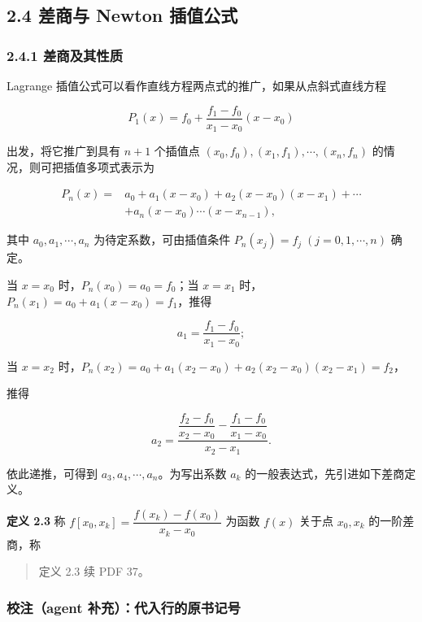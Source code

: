 \documentclass[
  10pt,
  fontset=fandol]{ctexart}
\begin{document}
\subsection{2.4 差商与 Newton 插值公式}\label{ux5deeux5546ux4e0e-newton-ux63d2ux503cux516cux5f0f}

\subsubsection{2.4.1 差商及其性质}\label{ux5deeux5546ux53caux5176ux6027ux8d28}

Lagrange 插值公式可以看作直线方程两点式的推广，如果从点斜式直线方程

\[
P_1(x)=f_0+\frac{f_1-f_0}{x_1-x_0}(x-x_0)
\]

出发，将它推广到具有 \(n+1\) 个插值点 \((x_0,\allowbreak f_0),\allowbreak (x_1,\allowbreak f_1),\allowbreak \cdots,\allowbreak (x_n,\allowbreak f_n)\) 的情况，则可把插值多项式表示为

\[
\begin{aligned}
P_n(x)={}&a_0+a_1(x-x_0)+a_2(x-x_0)(x-x_1)+\cdots\\
&+a_n(x-x_0)\cdots(x-x_{n-1}),
\end{aligned}
\tag{2.4.1}
\]

其中 \(a_0,a_1,\cdots,a_n\) 为待定系数，可由插值条件 \(P_n(x_j)=f_j\;(j=0,1,\cdots,n)\) 确定。

当 \(x=x_0\) 时，\(P_n(x_0)=a_0=f_0\)；当 \(x=x_1\) 时，\(P_n(x_1)=a_0+a_1(x-x_0)=f_1\)，推得

\[
a_1=\frac{f_1-f_0}{x_1-x_0};
\]

当 \(x=x_2\) 时，\(P_n(x_2)=a_0+a_1(x_2-x_0)+a_2(x_2-x_0)(x_2-x_1)=f_2\)，

推得

\[
a_2=\frac{\dfrac{f_2-f_0}{x_2-x_0}-\dfrac{f_1-f_0}{x_1-x_0}}{x_2-x_1}.
\]

依此递推，可得到 \(a_3,a_4,\cdots,a_n\)。为写出系数 \(a_k\) 的一般表达式，先引进如下差商定义。

\textbf{定义 2.3} 称 \(f[x_0,x_k]=\dfrac{f(x_k)-f(x_0)}{x_k-x_0}\) 为函数 \(f(x)\) 关于点 \(x_0,x_k\) 的一阶差商，称

\begin{quote}
定义 2.3 续 PDF 37。
\end{quote}

\subsubsection{校注（agent 补充）：代入行的原书记号}\label{ux6821ux6ce8agent-ux8865ux5145ux4ee3ux5165ux884cux7684ux539fux4e66ux8bb0ux53f7}
\end{document}
